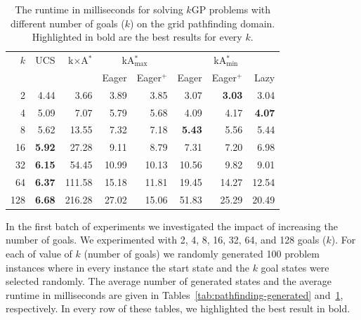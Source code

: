 \documentclass[twoside,11pt]{article}
\newcommand{\kgs}{$k$GP\xspace}
\newcommand{\kastarvar}[1]{\textup{kA}$^*_{#1}$\xspace}
\newcommand{\kastarmin}{\kastarvar{\min}}
\newcommand{\kastarmax}{\kastarvar{\max}}
\newcommand{\kxastar}{k$\times$A$^*$\xspace}
\begin{document}
\begin{table}
  \centering
  \caption{The runtime in milliseconds for solving \kgs problems with different number of goals ($k$) on the grid pathfinding domain. Highlighted in bold are the best results for every $k$.}
  \label{tab:pathfinding-runtime}
  \begin{tabular}{rrrrrrrr}
    \toprule
    $k$ & UCS & \kxastar & \multicolumn{2}{c}{\kastarmax} & \multicolumn{3}{c}{\kastarmin}\\
    \cmidrule(r){4-5}\cmidrule(l){6-8}
        &     &          & Eager   & Eager$^+$ & Eager   & Eager$^+$ & Lazy\\
    \midrule
    2   & 4.44          &  3.66  &  3.89 &  3.85 &  3.07         & \textbf{3.03} &  3.04\\
    4   & 5.09          &  7.07  &  5.79 &  5.68 &  4.09         &  4.17 & \textbf{4.07}\\
    8   & 5.62          &  13.55 &  7.32 &  7.18 & \textbf{5.43} &  5.56         &  5.44\\
    16  & \textbf{5.92} &  27.28 &  9.11 &  8.79 &  7.31         &  7.20         &  6.98\\
    32  & \textbf{6.15} &  54.45 & 10.99 & 10.13 & 10.56         &  9.82         &  9.01\\
    64  & \textbf{6.37} & 111.58 & 15.18 & 11.81 & 19.45         & 14.27         & 12.54\\
    128 & \textbf{6.68} & 216.28 & 27.02 & 15.06 & 51.83         & 25.29         & 20.49\\
    \bottomrule
    \end{tabular}
\end{table}


In the first batch of experiments we investigated the impact of increasing the number of goals.
We experimented with 2, 4, 8, 16, 32, 64, and 128 goals ($k$).
For each of value of $k$ (number of goals) we randomly generated 100 problem instances where in every instance the start state and the $k$ goal states were selected randomly.
The average number of generated states and the average runtime in milliseconds are given in
Tables~\ref{tab:pathfinding-generated} and~\ref{tab:pathfinding-runtime}, respectively.
In every row of these tables, we highlighted the best result in bold.

\end{document}
